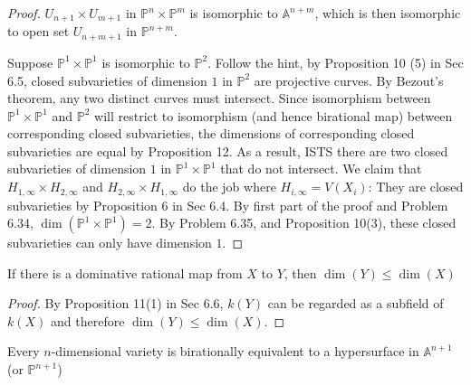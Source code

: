 \documentclass{solution}
\begin{document}
\begin{proof}
    $U_{n + 1} \times U_{m + 1}$ in $\mathbb{P}^n \times \mathbb{P}^m$ is isomorphic to $\mathbb{A}^{n + m}$, which is then isomorphic to open set $U_{n + m + 1}$ in $\mathbb{P}^{n + m}$.

    Suppose $\mathbb{P}^1 \times \mathbb{P}^1$ is isomorphic to $\mathbb{P}^2$. Follow the hint, by Proposition 10 (5) in Sec 6.5, closed subvarieties of dimension $1$ in $\mathbb{P}^2$ are projective curves. By Bezout's theorem, any two distinct curves must intersect. Since isomorphism between $\mathbb{P}^1 \times \mathbb{P}^1$ and $\mathbb{P}^2$ will restrict to isomorphism (and hence birational map) between corresponding closed subvarieties, the dimensions of corresponding closed subvarieties are equal by Proposition 12. As a result, ISTS there are two closed subvarieties of dimension $1$ in $\mathbb{P}^1 \times \mathbb{P}^1$ that do not intersect. We claim that $H_{1, \infty} \times H_{2, \infty}$ and $H_{2, \infty} \times H_{1, \infty}$ do the job where $H_{i, \infty} = V(X_i)$: They are closed subvarieties by Proposition 6 in Sec 6.4. By first part of the proof and Problem 6.34, $\dim (\mathbb{P}^1 \times \mathbb{P}^1) = 2$. By Problem 6.35, and Proposition 10(3), these closed subvarieties can only have dimension $1$.
\end{proof}

\begin{problem}{6.40}
    If there is a dominative rational map from $X$ to $Y$, then $\dim(Y) \le \dim (X)$
\end{problem}

\begin{proof}
    By Proposition 11(1) in Sec 6.6, $k(Y)$ can be regarded as a subfield of $k(X)$ and therefore $\dim (Y) \le \dim (X)$.
\end{proof}

\begin{problem}{6.41}
    Every $n$-dimensional variety is birationally equivalent to a hypersurface in $\mathbb{A}^{n + 1}$ (or $\mathbb{P}^{n + 1}$)
\end{problem}
\end{document}

